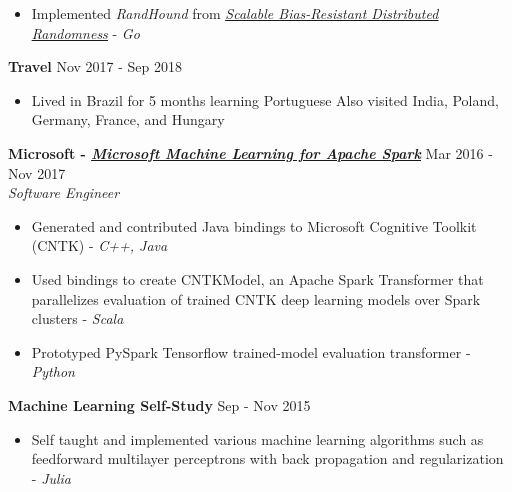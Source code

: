 \documentclass[overlapped]{res}
\begin{document}
\begin{resume}
\begin{itemize}
      \item Implemented {\em RandHound\/} from \href{Scalable Bias-Resistant Distributed Randomness}{\underline{{\em Scalable Bias-Resistant Distributed Randomness\/}}} - {\em Go}
    \end{itemize}

    {\bf Travel} \hfill Nov 2017 - Sep 2018
    \begin{itemize} \itemsep-2pt
        \item
            Lived in Brazil for 5 months learning Portuguese
            Also visited India, Poland, Germany, France, and Hungary
    \end{itemize}


    {\bf Microsoft - \href{https://www.github.com/Azure/mmlspark}{\underline{\em Microsoft Machine Learning for Apache Spark}}} \hfill Mar 2016 - Nov 2017 \\
    {\em Software Engineer}
    \begin{itemize} \itemsep-2pt
        \item
          Generated and contributed Java bindings to Microsoft Cognitive Toolkit (CNTK) - {\em C++, Java}
        \item
          Used bindings to create CNTKModel, an Apache Spark Transformer that parallelizes evaluation of trained CNTK deep learning models over Spark clusters - {\em Scala\/}
        \item
          Prototyped PySpark Tensorflow trained-model evaluation transformer - {\em Python\/}
    \end{itemize}

    {\bf Machine Learning Self-Study} \hfill Sep - Nov 2015
    \begin{itemize} \itemsep-2pt
        \item
          Self taught and implemented various machine learning algorithms such as feedforward multilayer perceptrons with back propagation and regularization - {\em Julia}
    \end{itemize}



\end{resume}
\end{document}
